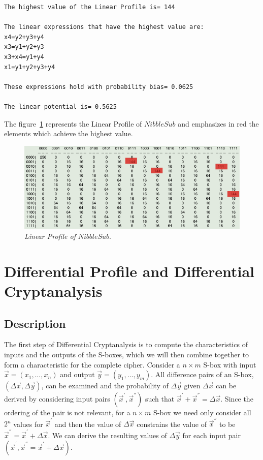 \begin{example}
\begin{verbatim}
The highest value of the Linear Profile is= 144

The linear expressions that have the highest value are:
x4=y2+y3+y4
x3=y1+y2+y3
x3+x4=y1+y4
x1=y1+y2+y3+y4

These expressions hold with probability bias= 0.0625

The linear potential is= 0.5625
\end{verbatim}

The figure~\ref{fig:LP} represents the Linear Profile of $NibbleSub$ and emphasizes in red the elements which achieve the highest value. 

\begin{figure}[htbp!]
\centering
\includegraphics[width=\textwidth]{LP}
\caption[Linear Profile of NibbleSub]{\textit{Linear Profile of }$NibbleSub$.}
\label{fig:LP}
\end{figure}

\end{example}

\section{Differential Profile and Differential Cryptanalysis}
\label{sec:DP}

\subsection{Description}

The first step of Differential Cryptanalysis is to compute the characteristics of inputs and the outputs of the S-boxes, which we will then combine together to form a characteristic for the complete cipher. Consider a $n \times m$ S-box with input $\vec{x} = (x_1, \ldots, x_n)$ and output $\vec{y} = (y_1,\ldots,y_m)$. All difference pairs of an S-box, $(\Delta \vec{x}, \Delta \vec{y})$, can be examined and the probability of $\Delta \vec{y}$ given $\Delta \vec{x}$ can be derived by considering input pairs $(\vec{x}^{'},\vec{x}^{''})$ such that $\vec{x}^{'}+\vec{x}^{''} = \Delta \vec{x}$. Since the ordering of the pair is not relevant, for a $n \times m$ S-box we need only consider all $2^n$ values for $\vec{x}^{'}$ and then the value of $\Delta \vec{x}$ constrains the value of $\vec{x}^{''}$ to be $\vec{x}^{''} = \vec{x}^{'}+\Delta \vec{x}$. We can derive the resulting values of $\Delta \vec{y}$ for each input pair $(\vec{x}^{'}, \vec{x}^{''} = \vec{x}^{'}+\Delta \vec{x})$.

